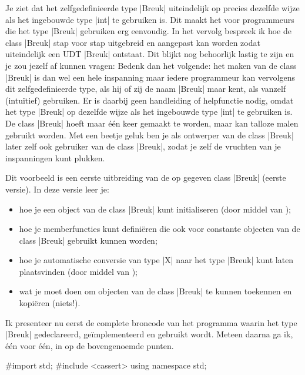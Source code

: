 \begin{cpplstShortInline}
Je ziet dat het zelfgedefinieerde type |Breuk| uiteindelijk op precies dezelfde wijze als het ingebouwde type |int| te gebruiken is.
Dit maakt het voor programmeurs die het type |Breuk| gebruiken erg eenvoudig.
In het vervolg bespreek ik hoe de class |Breuk| stap voor stap uitgebreid en aangepast kan worden zodat uiteindelijk een UDT |Breuk| ontstaat.
Dit blijkt nog behoorlijk lastig te zijn en je zou jezelf af kunnen vragen: 
Bedenk dan het volgende: het maken van de class |Breuk| is dan wel een hele inspanning maar iedere programmeur kan vervolgens dit zelfgedefinieerde type, als hij of zij de naam |Breuk| maar kent, als vanzelf (intuïtief) gebruiken.
Er is daarbij geen handleiding of helpfunctie nodig, omdat het type |Breuk| op dezelfde wijze als het ingebouwde type |int| te gebruiken is.
De class |Breuk| hoeft maar één keer gemaakt te worden, maar kan talloze malen gebruikt worden.
Met een beetje geluk ben je als ontwerper van de class |Breuk| later zelf ook gebruiker van de class |Breuk|, zodat je zelf de vruchten van je inspanningen kunt plukken.

\label{breuk1}
Dit voorbeeld is een eerste uitbreiding van de op  gegeven class |Breuk| (eerste versie). In deze versie leer je:
\begin{itemize}
    \item hoe je een object van de class |Breuk| kunt initialiseren (door middel van \emph{});
    \item hoe je memberfuncties kunt definiëren die ook voor constante objecten van de class |Breuk| gebruikt kunnen worden;
    \item hoe je automatische conversie van type |X| naar het type |Breuk| kunt laten plaatsvinden (door middel van );
    \item wat je moet doen om objecten van de class |Breuk| te kunnen toekennen en kopiëren (niets!).
\end{itemize}

Ik presenteer nu eerst de complete broncode van het programma  waarin het type |Breuk| gedeclareerd, geïmplementeerd en gebruikt wordt.
Meteen daarna ga ik, één voor één, in op de bovengenoemde punten.

\begin{cpplstfragment}[mathescape=true]
#import std;
#include <cassert>
using namespace std;


\end{cpplstfragment}
\end{cpplstShortInline}
